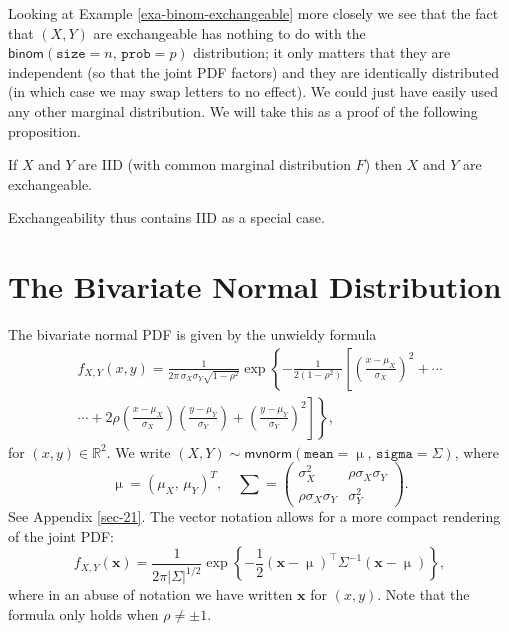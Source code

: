 \documentclass[captions=tableheading]{scrbook}
\begin{document}
Looking at Example \ref{exa-binom-exchangeable} more closely we see that the fact that \((X,Y)\) are exchangeable has nothing to do with the \(\mathsf{binom}(\mathtt{size}=n,\,\mathtt{prob}=p)\) distribution; it only matters that they are independent (so that the joint PDF factors) and they are identically distributed (in which case we may swap letters to no effect). We could just have easily used any other marginal distribution. We will take this as a proof of the following proposition.

\begin{prop}
If \(X\) and \(Y\) are IID (with common marginal distribution \(F\)) then \(X\) and \(Y\) are exchangeable. 
\end{prop}

Exchangeability thus contains IID as a special case. 
\section{The Bivariate Normal Distribution}
\label{sec-7-6}
\label{sec-The-Bivariate-Normal}


The bivariate normal PDF is given by the unwieldy formula
\begin{multline}
f_{X,Y}(x,y)=\frac{1}{2\pi\,\sigma_{X}\sigma_{Y}\sqrt{1-\rho^{2}}}\exp\left\{ -\frac{1}{2(1-\rho^{2})}\left[\left(\frac{x-\mu_{X}}{\sigma_{X}}\right)^{2}+\cdots\right.\right.\\
\left.\left.\cdots+2\rho\left(\frac{x-\mu_{X}}{\sigma_{X}}\right)\left(\frac{y-\mu_{Y}}{\sigma_{Y}}\right)+\left(\frac{y-\mu_{Y}}{\sigma_{Y}}\right)^{2}\right]\right\} ,
\end{multline}
for \((x,y)\in\mathbb{R}^{2}\). We write \((X,Y)\sim\mathsf{mvnorm}(\mathtt{mean}=\upmu,\,\mathtt{sigma}=\Sigma)\), where
\begin{equation}
\upmu=(\mu_{X},\,\mu_{Y})^{T},\quad\sum=\left(
\begin{array}{cc}
\sigma_{X}^{2} & \rho\sigma_{X}\sigma_{Y}\\
\rho\sigma_{X}\sigma_{Y} & \sigma_{Y}^{2}
\end{array}
\right).
\end{equation}
See Appendix \ref{sec-21}. The vector notation allows for a more compact rendering of the joint PDF:
\begin{equation}
f_{X,Y}(\mathbf{x})=\frac{1}{2\pi\left|\Sigma\right|^{1/2}}\exp\left\{ -\frac{1}{2}\left(\mathbf{x}-\upmu\right)^{\top}\Sigma^{-1}\left(\mathbf{x}-\upmu\right)\right\} ,
\end{equation}
where in an abuse of notation we have written \(\mathbf{x}\) for \((x,y)\). Note that the formula only holds when \(\rho\neq\pm1\).
\end{document}
